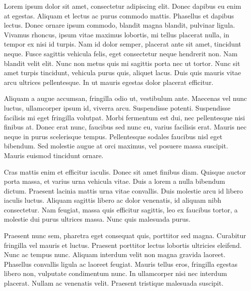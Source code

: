 
Lorem ipsum dolor sit amet, consectetur adipiscing elit. Donec dapibus eu enim at egestas. Aliquam et lectus ac purus commodo mattis. Phasellus et dapibus lectus. Donec ornare ipsum commodo, blandit magna blandit, pulvinar ligula. Vivamus rhoncus, ipsum vitae maximus lobortis, mi tellus placerat nulla, in tempor ex nisi id turpis. Nam id dolor semper, placerat ante sit amet, tincidunt neque. Fusce sagittis vehicula felis, eget consectetur neque hendrerit non. Nam blandit velit elit. Nunc non metus quis mi sagittis porta nec ut tortor. Nunc sit amet turpis tincidunt, vehicula purus quis, aliquet lacus. Duis quis mauris vitae arcu ultrices pellentesque. In ut mauris egestas dolor placerat efficitur.

Aliquam a augue accumsan, fringilla odio ut, vestibulum ante. Maecenas vel nunc luctus, ullamcorper ipsum id, viverra arcu. Suspendisse potenti. Suspendisse facilisis mi eget fringilla volutpat. Morbi fermentum est dui, nec pellentesque nisi finibus at. Donec erat nunc, faucibus sed nunc eu, varius facilisis erat. Mauris nec neque in purus scelerisque tempus. Pellentesque sodales faucibus nisl eget bibendum. Sed molestie augue at orci maximus, vel posuere massa suscipit. Mauris euismod tincidunt ornare.

Cras mattis enim et efficitur iaculis. Donec sit amet finibus diam. Quisque auctor porta massa, et varius urna vehicula vitae. Duis a lorem a nulla bibendum dictum. Praesent lacinia mattis urna vitae convallis. Duis molestie arcu id libero iaculis luctus. Aliquam sagittis libero ac dolor venenatis, id aliquam nibh consectetur. Nam feugiat, massa quis efficitur sagittis, leo ex faucibus tortor, a molestie dui purus ultrices massa. Nunc quis malesuada purus.

Praesent nunc sem, pharetra eget consequat quis, porttitor sed magna. Curabitur fringilla vel mauris et luctus. Praesent porttitor lectus lobortis ultricies eleifend. Nunc ac tempus nunc. Aliquam interdum velit non magna gravida laoreet. Phasellus convallis ligula ac laoreet feugiat. Mauris tellus eros, fringilla egestas libero non, vulputate condimentum nunc. In ullamcorper nisi nec interdum placerat. Nullam ac venenatis velit. Praesent tristique malesuada suscipit.

